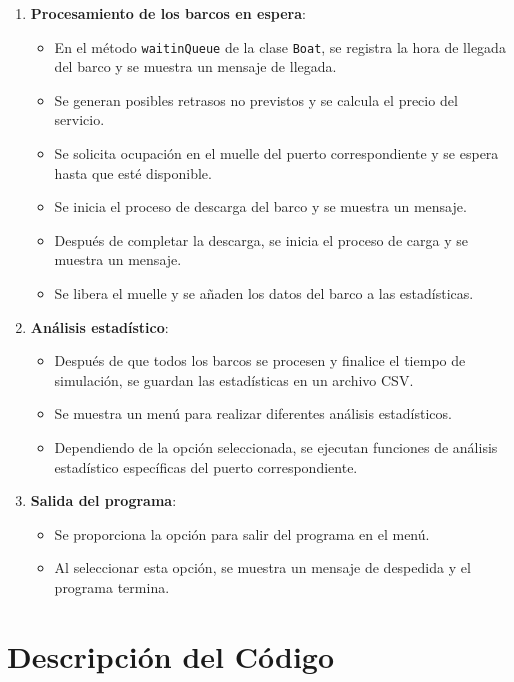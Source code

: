 \documentclass[12pt]{article}
\begin{document}
\begin{enumerate}
    \item \textbf{Procesamiento de los barcos en espera}:
    \begin{itemize}
        \item En el método \texttt{waitinQueue} de la clase \texttt{Boat}, se registra la hora de llegada del barco y se muestra un mensaje de llegada.
        \item Se generan posibles retrasos no previstos y se calcula el precio del servicio.
        \item Se solicita ocupación en el muelle del puerto correspondiente y se espera hasta que esté disponible.
        \item Se inicia el proceso de descarga del barco y se muestra un mensaje.
        \item Después de completar la descarga, se inicia el proceso de carga y se muestra un mensaje.
        \item Se libera el muelle y se añaden los datos del barco a las estadísticas.
    \end{itemize}
    
    \item \textbf{Análisis estadístico}:
    \begin{itemize}
        \item Después de que todos los barcos se procesen y finalice el tiempo de simulación, se guardan las estadísticas en un archivo CSV.
        \item Se muestra un menú para realizar diferentes análisis estadísticos.
        \item Dependiendo de la opción seleccionada, se ejecutan funciones de análisis estadístico específicas del puerto correspondiente.
    \end{itemize}
    
    \item \textbf{Salida del programa}:
    \begin{itemize}
        \item Se proporciona la opción para salir del programa en el menú.
        \item Al seleccionar esta opción, se muestra un mensaje de despedida y el programa termina.
    \end{itemize}
\end{enumerate}

    

        

\section {Descripción del Código}
\end{document}

